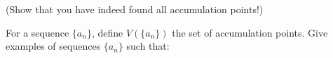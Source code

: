 \documentclass[week=4]{homework}
\begin{document}
\begin{questions}
        (Show that you have indeed found all accumulation points!)
        
        \question
        For a sequence $\{a_n \} $, define $V(\{a_n \})$ the set of accumulation points. Give examples of sequences $\{a_n \}$ such that:
        
     \end{questions}
\end{document}
